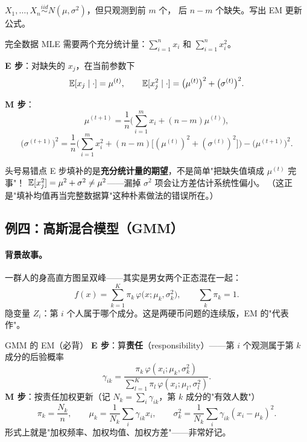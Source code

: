 \begin{exbox}[缺失数据下估正态参数]
$X_1,\dots,X_n\overset{iid}{\sim}N(\mu,\sigma^2)$，但只观测到前 $m$ 个，
后 $n-m$ 个缺失。写出 EM 更新公式。
\end{exbox}
\begin{sol}
完全数据 MLE 需要两个充分统计量：$\sum_{i=1}^n x_i$ 和 $\sum_{i=1}^n x_i^2$。

\textbf{E 步}：对缺失的 $x_j$，在当前参数下
\[
\mathbb{E}[x_j\mid\cdot]=\mu^{(t)},\qquad
\mathbb{E}[x_j^2\mid\cdot]=\big(\mu^{(t)}\big)^2+\big(\sigma^{(t)}\big)^2 .
\]

\textbf{M 步}：
\[
\mu^{(t+1)}=\frac{1}{n}\Big(\sum_{i=1}^m x_i+(n-m)\mu^{(t)}\Big),
\]
\[
\big(\sigma^{(t+1)}\big)^2=\frac{1}{n}\Big(\sum_{i=1}^m x_i^2
+(n-m)\big[(\mu^{(t)})^2+(\sigma^{(t)})^2\big]\Big)-\big(\mu^{(t+1)}\big)^2 .
\]
\end{sol}

\begin{wbox}{头号易错点}
E 步填补的是\textbf{充分统计量的期望}，不是简单"把缺失值填成 $\mu^{(t)}$ 完事"！
$\mathbb{E}[x_j^2]=\mu^2+\sigma^2\ne\mu^2$——漏掉 $\sigma^2$ 项会让方差估计系统性偏小。
（这正是"填补均值再当完整数据算"这种朴素做法的错误所在。）
\end{wbox}

\subsection{例四：高斯混合模型（GMM）}

\paragraph{背景故事。}一群人的身高直方图呈双峰——其实是男女两个正态混在一起：
\[
f(x)=\sum_{k=1}^K\pi_k\,\varphi\big(x;\mu_k,\sigma_k^2\big),\qquad
\sum_k\pi_k=1 .
\]
隐变量 $Z_i$：第 $i$ 个人属于哪个成分。这是两硬币问题的连续版，EM 的"代表作"。

\begin{kbox}{GMM 的 EM（必背）}
\textbf{E 步}：算\textbf{责任}（responsibility）——第 $i$ 个观测属于第 $k$ 成分的后验概率
\[
\gamma_{ik}=\frac{\pi_k\,\varphi(x_i;\mu_k,\sigma_k^2)}
{\sum_{l=1}^K\pi_l\,\varphi(x_i;\mu_l,\sigma_l^2)} .
\]
\textbf{M 步}：按责任加权更新（记 $N_k=\sum_i\gamma_{ik}$，第 $k$ 成分的"有效人数"）
\[
\pi_k=\frac{N_k}{n},\qquad
\mu_k=\frac{1}{N_k}\sum_i\gamma_{ik}x_i,\qquad
\sigma_k^2=\frac{1}{N_k}\sum_i\gamma_{ik}(x_i-\mu_k)^2 .
\]
形式上就是"加权频率、加权均值、加权方差"——非常好记。
\end{kbox}

